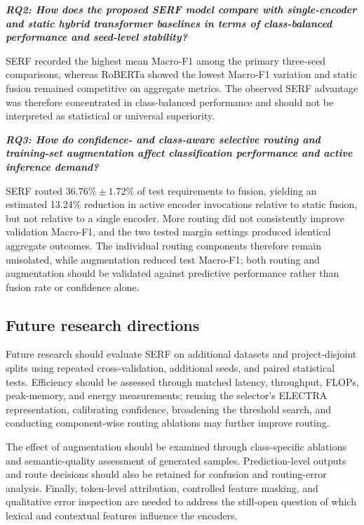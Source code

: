 \documentclass[runningheads]{llncs}
\begin{document}
\emph{\textbf{RQ2: How does the proposed SERF model compare with single-encoder and static hybrid transformer baselines in terms of class-balanced performance and seed-level stability?}}

SERF recorded the highest mean Macro-F1 among the primary three-seed comparisons, whereas RoBERTa showed the lowest Macro-F1 variation and static fusion remained competitive on aggregate metrics. The observed SERF advantage was therefore concentrated in class-balanced performance and should not be interpreted as statistical or universal superiority.

\emph{\textbf{RQ3: How do confidence- and class-aware selective routing and training-set augmentation affect classification performance and active inference demand?}}

SERF routed \(36.76\% \pm 1.72\%\) of test requirements to fusion, yielding an estimated 13.24\% reduction in active encoder invocations relative to static fusion, but not relative to a single encoder. More routing did not consistently improve validation Macro-F1, and the two tested margin settings produced identical aggregate outcomes. The individual routing components therefore remain unisolated, while augmentation reduced test Macro-F1; both routing and augmentation should be validated against predictive performance rather than fusion rate or confidence alone.

\subsection*{Future research directions}\label{sec:future-work}

Future research should evaluate SERF on additional datasets and project-disjoint splits using repeated cross-validation, additional seeds, and paired statistical tests. Efficiency should be assessed through matched latency, throughput, FLOPs, peak-memory, and energy measurements; reusing the selector's ELECTRA representation, calibrating confidence, broadening the threshold search, and conducting component-wise routing ablations may further improve routing.

The effect of augmentation should be examined through class-specific ablations and semantic-quality assessment of generated samples. Prediction-level outputs and route decisions should also be retained for confusion and routing-error analysis. Finally, token-level attribution, controlled feature masking, and qualitative error inspection are needed to address the still-open question of which lexical and contextual features influence the encoders.
\end{document}
